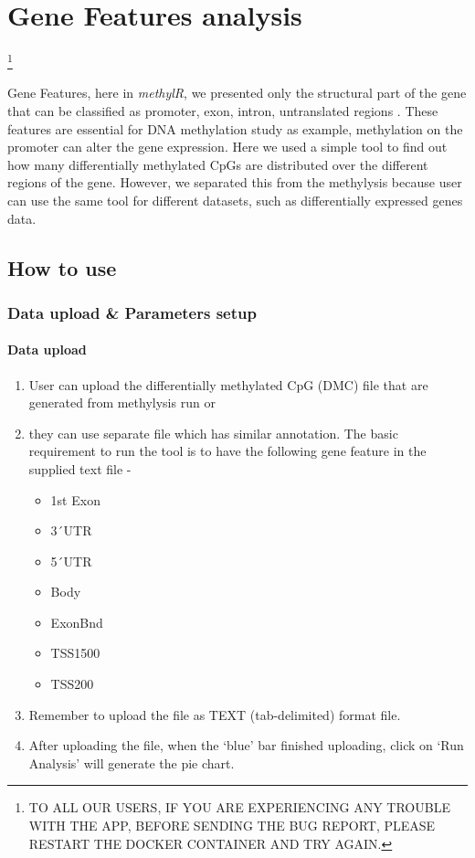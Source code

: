 \documentclass[
  a4paper,
  DIV=11,
  numbers=noendperiod,
  oneside,
  open=any]{scrreport}
\providecommand{\tightlist}{%
  \setlength{\itemsep}{0pt}\setlength{\parskip}{0pt}}\usepackage{longtable,booktabs,array}
\begin{document}
\chapter{Gene Features analysis}\label{sec-genfeatures}

\footnote{TO ALL OUR USERS, IF YOU ARE EXPERIENCING ANY TROUBLE WITH THE
  APP, BEFORE SENDING THE BUG REPORT, PLEASE RESTART THE DOCKER
  CONTAINER AND TRY AGAIN.}

Gene Features, here in \emph{methylR}, we presented only the structural
part of the gene that can be classified as promoter, exon, intron,
untranslated regions \autocite{skolnick2000structural}. These features
are essential for DNA methylation study as example, methylation on the
promoter can alter the gene expression. Here we used a simple tool to
find out how many differentially methylated CpGs are distributed over
the different regions of the gene. However, we separated this from the
methylysis because user can use the same tool for different datasets,
such as differentially expressed genes data.

\section{How to use}\label{how-to-use-3}

\subsection{Data upload \& Parameters
setup}\label{data-upload-parameters-setup-1}

\subsubsection{Data upload}\label{data-upload-1}

\begin{enumerate}
\def\labelenumi{\arabic{enumi}.}
\tightlist
\item
  User can upload the differentially methylated CpG (DMC) file that are
  generated from methylysis run or
\item
  they can use separate file which has similar annotation. The basic
  requirement to run the tool is to have the following gene feature in
  the supplied text file -

  \begin{itemize}
  \tightlist
  \item
    1st Exon
  \item
    3´UTR
  \item
    5´UTR
  \item
    Body
  \item
    ExonBnd
  \item
    TSS1500
  \item
    TSS200
  \end{itemize}
\item
  Remember to upload the file as TEXT (tab-delimited) format file.
\item
  After uploading the file, when the `blue' bar finished uploading,
  click on `Run Analysis' will generate the pie chart.
\end{enumerate}
\end{document}
